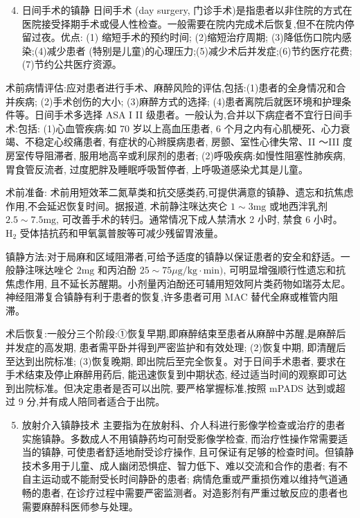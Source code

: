 \documentclass[10pt]{article}
\begin{document}
\begin{enumerate}
  \setcounter{enumi}{3}
  \item 日间手术的镇静 日间手术 (day surgery, 门诊手术)是指患者以非住院的方式在医院接受择期手术或侵人性检查。一般需要在院内完成术后恢复,但不在院内停留过夜。优点: (1) 缩短手术的预约时间; (2)缩短治疗周期; (3)降低伤口院内感染;(4)减少患者 (特别是儿童)的心理压力;(5)减少术后并发症;(6)节约医疗花费;(7)节约公共医疗资源。
\end{enumerate}

术前病情评估:应对患者进行手术、麻醉风险的评估,包括:(1)患者的全身情况和合并疾病; (2)手术创伤的大小; (3)麻醉方式的选择; (4)患者离院后就医环境和护理条件等。日间手术多选择 ASA I II 级患者。一般认为,合并以下病症者不宜行日间手术:包括: (1)心血管疾病:如 70 岁以上高血压患者, 6 个月之内有心肌梗死、心力衰竭、不稳定心绞痛患者, 有症状的心辫膜病患者, 房颤、室性心律失常、II ～III 度房室传导阻滞者, 服用地高辛或利尿剂的患者; (2)呼吸疾病:如慢性阻塞性肺疾病, 胃食管反流者, 过度肥胖及睡眠呼吸暂停者, 上呼吸道感染尤其是儿童。

术前准备: 术前用短效苯二氮草类和抗交感类药,可提供满意的镇静、遗忘和抗焦虑作用,不会延迟恢复时间。据报道, 术前静注咪达夾仑 $1 \sim 3 \mathrm{mg}$ 或地西泮乳剂 $2.5 \sim 7.5 \mathrm{mg}$, 可改善手术的转归。通常情况下成人禁清水 2 小时, 禁食 6 小时。 $\mathrm{H}_{2}$ 受体拮抗药和甲氧氯普胺等可减少残留胃液量。

镇静方法:对于局麻和区域阻滞者,可给予适度的镇静以保证患者的安全和舒适。一般静注咪达唑仑 $2 \mathrm{mg}$ 和丙泊酚 $25 \sim 75 \mu \mathrm{g} / \mathrm{kg} \cdot \mathrm{min})$, 可明显增强顺行性遗忘和抗焦虑作用, 且不延长苏醒期。小剂量丙泊酚还可辅用短效阿片类药物如瑞芬太尼。神经阻滞复合镇静有利于患者的恢复,许多患者可用 MAC 替代全麻或椎管内阻滞。

术后恢复:一般分三个阶段:①恢复早期,即麻醉结束至患者从麻醉中苏醒,是麻醉后并发症的高发期, 患者需平卧并得到严密监护和有效处理; (2)恢复中期, 即清醒后至达到出院标准; (3)恢复晚期, 即出院后至完全恢复。对于日间手术患者, 要求在手术结束及停止麻醉用药后, 能迅速恢复到中期状态, 经过适当时间的观察即可达到出院标准。但决定患者是否可以出院, 要严格掌握标准,按照 mPADS 达到或超过 9 分,并有成人陪同者适合于出院。

\begin{enumerate}
  \setcounter{enumi}{4}
  \item 放射介入镇静技术 主要指为在放射科、介人科进行影像学检查或治疗的患者实施镇静。多数成人不用镇静药均可耐受影像学检查, 而治疗性操作常需要适当的镇静, 可使患者舒适地耐受诊疗操作, 且可保证有足够的检查时间。但镇静技术多用于儿童、成人幽闭恐惧症、智力低下、难以交流和合作的患者; 有不自主运动或不能耐受长时间静卧的患者; 病情危重或严重损伤难以维持气道通畅的患者, 在诊疗过程中需要严密监测者。对造影剂有严重过敏反应的患者也需要麻醉科医师参与处理。
\end{enumerate}
\end{document}
